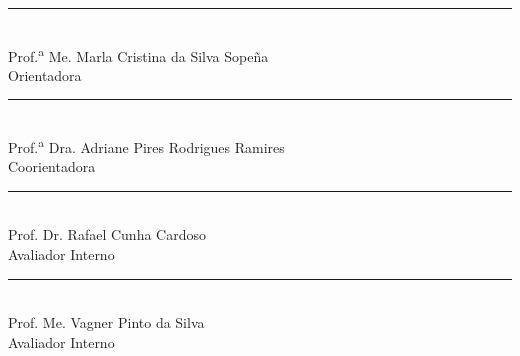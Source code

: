 \vspace{1.2cm}


\begin{center}
    \rule{8.5cm}{0.6pt}\\
    Prof.\textsuperscript{a} Me. Marla Cristina da Silva Sopeña\\
    Orientadora
    
    \vspace{0.9cm}
    
    \rule{8.5cm}{0.6pt}\\
    Prof.\textsuperscript{a} Dra. Adriane Pires Rodrigues Ramires\\
    Coorientadora
    
    \vspace{0.9cm}
    
    \rule{8.5cm}{0.6pt}\\
    Prof. Dr. Rafael Cunha Cardoso\\
    Avaliador Interno
    
    \vspace{0.9cm}
    
    \rule{8.5cm}{0.6pt}\\
    Prof. Me. Vagner Pinto da Silva\\
    Avaliador Interno
\end{center}

\restoregeometry
\clearpage

